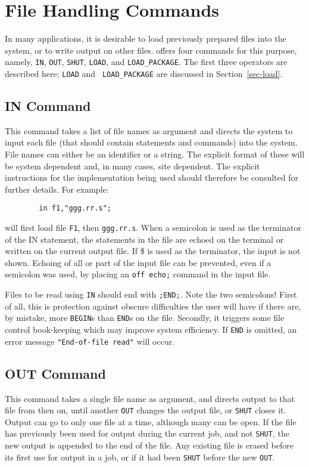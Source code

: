 \chapter{File Handling Commands}

In many applications, it is desirable to load previously prepared {\REDUCE}
files into the system, or to write output on other files. {\REDUCE} offers
four commands for this purpose, namely, {\tt IN}, {\tt OUT}, {\tt SHUT},
{\tt LOAD}, and {\tt LOAD\_PACKAGE}.  The first
 three operators are described here; {\tt LOAD} and {\tt
LOAD\_PACKAGE} are discussed in Section~\ref{sec-load}.

\section{IN Command}
This command takes a list of file names as argument and directs the system
to input each file (that should contain {\REDUCE} statements
and commands) into the system.  File names can either be an identifier or
a string.  The explicit format of these will be system dependent and, in
many cases, site dependent.  The explicit instructions for the
implementation being used should therefore be consulted for further
details. For example:
\begin{verbatim}
        in f1,"ggg.rr.s";
\end{verbatim}
will first load file {\tt F1}, then {\tt ggg.rr.s}.  When a semicolon is
used as the terminator of the IN statement, the statements in the file are
echoed on the terminal or written on the current output file.  If \$
 is used as the terminator, the input is not
shown.  Echoing of all or part of the input file can be prevented, even if
a semicolon was used, by placing an {\tt off echo;} command
in the input file.

Files to be read using {\tt IN} should end with {\tt ;END;}.  Note the two
semicolons!  First of all, this is protection against obscure difficulties
the user will have if there are, by mistake, more {\tt BEGIN}s than
{\tt END}s on the file.  Secondly, it triggers some file control book-keeping
which may improve system efficiency.  If {\tt END} is omitted, an error
message {\tt "End-of-file read"} will occur.

\section{OUT Command}
This command takes a single file name as argument, and directs output to
that file from then on, until another {\tt OUT} changes the output file,
or {\tt SHUT} closes it.  Output can go to only one file at a time,
although many can be open.  If the file has previously been used for
output during the current job, and not {\tt SHUT}, the new
output is appended to the end of the file.  Any existing file is erased
before its first use for output in a job, or if it had been {\tt SHUT}
before the new {\tt OUT}.

